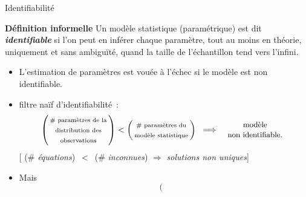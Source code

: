 \begin{frame}{\vskip -0.2cm \LARGE Identifiabilit\'e}

\vskip 0.0cm
\textbf{D\'efinition informelle}
\vskip 0.025cm
Un mod\`ele statistique (param\'etrique) est dit \emph{\textbf{identifiable}}
si l'on peut en inf\'erer chaque param\`etre,
tout au moins en th\'eorie, uniquement et sans ambigu\"it\'e,
quand la taille de l'\'echantillon tend vers l'infini.

\vskip 0.2cm

\footnotesize
\begin{itemize}
\pause\item
	L'estimation de param\`etres est {\color{red}vou\'ee \`a l'\'echec} si le mod\`ele est non identifiable.
	\vskip 0.01cm
	\vskip 0.2cm
\pause\item
	\og filtre na\"if d'identifiabilit\'e \fg\,:
	\vskip -0.4cm
	\begin{equation*}
	\left(\!\!\begin{array}{c}
		\textnormal{\scriptsize \# param\`etres de la} \\
		\textnormal{\scriptsize distribution des} \\
		\textnormal{\scriptsize observations}
	\end{array}\!\!\right)
	<
	\left(\!\!\begin{array}{c}
		\textnormal{\scriptsize \# param\`etres du} \\
		\textnormal{\scriptsize mod\`ele statistique}
	\end{array}\!\!\right)
	\;\;\Longrightarrow\;\;
	\begin{array}{c}
		\textnormal{\small mod\`ele} \\
		\textnormal{\small non identifiable.}
	\end{array}
	\end{equation*}
	\pause
	{[\; (\# \textit{\'equations}) \,$<$\, (\# \textit{inconnues}) \;$\Longrightarrow$\; \textit{solutions non uniques}\;]}
	\vskip 0.3cm
\pause\item
	Mais \tiny 
	\vskip -0.5cm
	\begin{equation*}
	\left(\!\!\begin{array}{c}

\end{array}
\end{equation*}
\end{itemize}
\end{frame}
